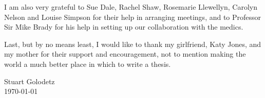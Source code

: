 \begin{acknowledgements}
\begin{itemize}
\end{itemize}
%
I am also very grateful to Sue Dale, Rachel Shaw, Rosemarie Llewellyn, Carolyn Nelson and Louise Simpson for their help in arranging meetings, and to Professor Sir Mike Brady for his help in setting up our collaboration with the medics.

Last, but by no means least, I would like to thank my girlfriend, Katy Jones, and my mother for their support and encouragement, not to mention making the world a much better place in which to write a thesis.

\begin{center}
Stuart Golodetz \\
\today
\end{center}

\end{acknowledgements}
